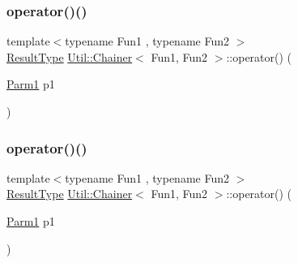 \subsubsection{\texorpdfstring{operator()()}{operator()()}\hspace{0.1cm}{\footnotesize\ttfamily [4/18]}}
{\footnotesize\ttfamily template$<$typename Fun1 , typename Fun2 $>$ \\
\mbox{\hyperlink{classUtil_1_1Chainer_a2c8d88a77b8ba93eb915dc799ddafbb9}{Result\+Type}} \mbox{\hyperlink{classUtil_1_1Chainer}{Util\+::\+Chainer}}$<$ Fun1, Fun2 $>$\+::operator() (\begin{DoxyParamCaption}\item[{\mbox{\hyperlink{classUtil_1_1Chainer_a3e09b2267dabdd8d12070b09c47749c6}{Parm1}}}]{p1 }\end{DoxyParamCaption})\hspace{0.3cm}{\ttfamily [inline]}}

\mbox{\label{classUtil_1_1Chainer_a44584550044ef436126ff4293c9502da}} 
\subsubsection{\texorpdfstring{operator()()}{operator()()}\hspace{0.1cm}{\footnotesize\ttfamily [5/18]}}
{\footnotesize\ttfamily template$<$typename Fun1 , typename Fun2 $>$ \\
\mbox{\hyperlink{classUtil_1_1Chainer_a2c8d88a77b8ba93eb915dc799ddafbb9}{Result\+Type}} \mbox{\hyperlink{classUtil_1_1Chainer}{Util\+::\+Chainer}}$<$ Fun1, Fun2 $>$\+::operator() (\begin{DoxyParamCaption}\item[{\mbox{\hyperlink{classUtil_1_1Chainer_a3e09b2267dabdd8d12070b09c47749c6}{Parm1}}}]{p1 }\end{DoxyParamCaption})\hspace{0.3cm}{\ttfamily [inline]}}

\mbox{\label{classUtil_1_1Chainer_a44584550044ef436126ff4293c9502da}} 
